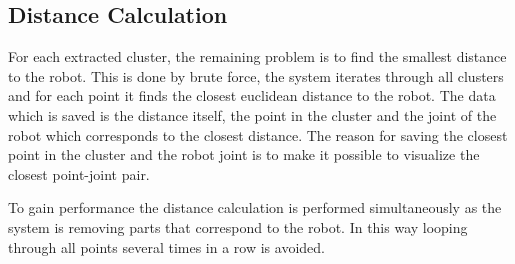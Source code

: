 \subsection{Distance Calculation}
For each extracted cluster, the remaining problem is to find the smallest distance to the  robot. 
This is done by brute force, the system iterates through all clusters and for each point it finds the closest euclidean distance to the robot. 
The data which is saved is the distance itself, the point in the cluster and the joint of the robot which corresponds to the closest distance. 
The reason for saving the closest point in the cluster and the robot joint is to make it possible to visualize the closest point-joint pair.

To gain performance the distance calculation is performed simultaneously as the system is removing parts that correspond to the robot. 
In this way looping through all points several times in a row is avoided.